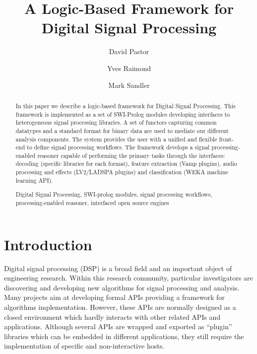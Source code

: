 \documentclass[runningheads]{llncs}
\newcommand{\keywords}[1]{\par\addvspace\baselineskip
\noindent\keywordname\enspace\ignorespaces#1}
\begin{document}
\mainmatter

\title{A Logic-Based Framework for Digital Signal Processing}


\author{David Pastor\and Yves Raimond\and Mark Sandler}


\maketitle


\begin{abstract}
In this paper we describe a logic-based framework for Digital Signal Processing. This framework is implemented as a set of SWI-Prolog modules developing interfaces to heterogeneous signal processing libraries. A set of functors capturing common datatypes and a standard format for binary data are used to mediate our different analysis components. The system provides the user with a unified and flexible front-end to define signal processing workflows. The framework develops a signal processing-enabled reasoner capable of performing the primary tasks through the interfaces: decoding (specific libraries for each format), feature extraction (Vamp plugins), audio processing and effects (LV2/LADSPA plugins) and classification (WEKA machine learning API).

\keywords{Digital Signal Processing, SWI-prolog modules, signal processing workflows, processing-enabled reasoner, interfaced open source engines}
\end{abstract}

\section{Introduction}\label{sec:intro}

Digital signal processing (DSP) is a broad field and an important object of engineering research. Within this research community, particular investigators are discovering and developing new algorithms for signal processing and analysis. Many projects aim at developing formal APIs providing a framework for algorithms implementation. However, these APIs are normally designed as a closed environment which hardly interacts with other related APIs and applications. Although several APIs are wrapped and exported as ``plugin'' libraries which can be embedded in different applications, they still require the implementation of specific and non-interactive hosts.
\end{document}
